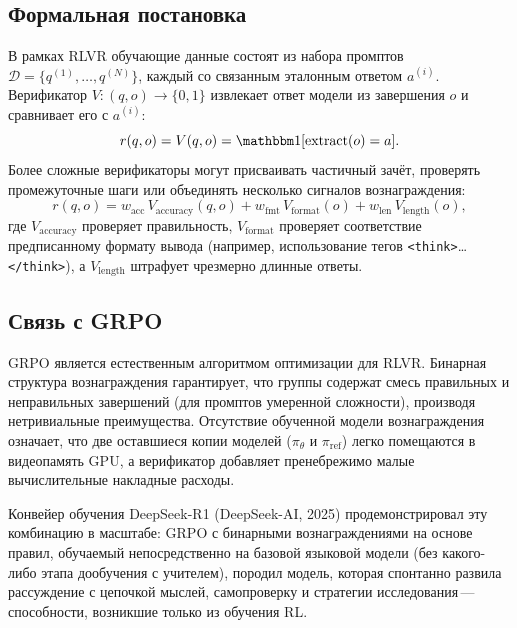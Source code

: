 \subsection{Формальная постановка}

В рамках RLVR обучающие данные состоят из набора промптов $\mathcal{D} = \{q^{(1)}, \ldots, q^{(N)}\}$, каждый со связанным эталонным ответом $a^{(i)}$. Верификатор $V: (q, o) \to \{0, 1\}$ извлекает ответ модели из завершения $o$ и сравнивает его с $a^{(i)}$:
\begin{equation}
\label{eq:rlvr-reward}
r(q, o) = V(q, o) = \ind[\text{extract}(o) = a].
\end{equation}
Более сложные верификаторы могут присваивать частичный зачёт, проверять промежуточные шаги или объединять несколько сигналов вознаграждения:
\begin{equation}
\label{eq:rlvr-composite}
r(q, o) = w_\mathrm{acc}\, V_\mathrm{accuracy}(q, o) + w_\mathrm{fmt}\, V_\mathrm{format}(o) + w_\mathrm{len}\, V_\mathrm{length}(o),
\end{equation}
где $V_\mathrm{accuracy}$ проверяет правильность, $V_\mathrm{format}$ проверяет соответствие предписанному формату вывода (например, использование тегов \texttt{<think>}\ldots\texttt{</think>}), а $V_\mathrm{length}$ штрафует чрезмерно длинные ответы.

\subsection{Связь с GRPO}

GRPO является естественным алгоритмом оптимизации для RLVR. Бинарная структура вознаграждения гарантирует, что группы содержат смесь правильных и неправильных завершений (для промптов умеренной сложности), производя нетривиальные преимущества. Отсутствие обученной модели вознаграждения означает, что две оставшиеся копии моделей ($\pi_\theta$ и $\pi_\mathrm{ref}$) легко помещаются в видеопамять GPU, а верификатор добавляет пренебрежимо малые вычислительные накладные расходы.

Конвейер обучения DeepSeek-R1 (DeepSeek-AI, 2025) продемонстрировал эту комбинацию в масштабе: GRPO с бинарными вознаграждениями на основе правил, обучаемый непосредственно на базовой языковой модели (без какого-либо этапа дообучения с учителем), породил модель, которая спонтанно развила рассуждение с цепочкой мыслей, самопроверку и стратегии исследования\,---\,способности, возникшие только из обучения RL.

